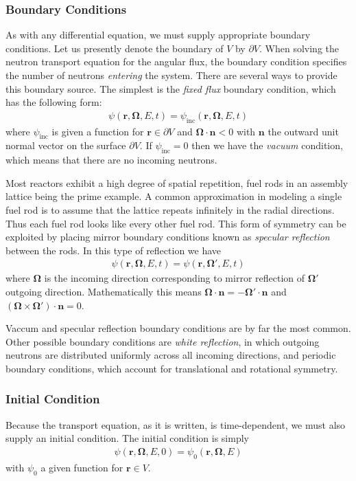 \documentclass[11pt]{article}
\renewcommand\vec{\mathbf}
\begin{document}
\subsubsection{Boundary Conditions}
\label{sec:orgheadline46}
As with any differential equation, we must supply appropriate boundary conditions.  Let us presently denote the boundary of \(V\) by \(\partial V\).  When solving the neutron transport equation for the angular flux, the boundary condition specifies the number of neutrons \emph{entering} the system.  There are several ways to provide this boundary source.  The simplest is the \emph{fixed flux} boundary condition, which has the following form:
\begin{align}
  \psi(\vec{r},\vec{\Omega},E,t) = \psi_\text{inc}(\vec{r},\vec{\Omega},E,t)
\end{align}
where \(\psi_\text{inc}\) is given a function for \(\vec{r} \in \partial V\) and \(\vec{\Omega} \cdot \vec{n} < 0\) with \(\vec{n}\) the outward unit normal vector on the surface \(\partial V\).  If \(\psi_\text{inc} = 0\) then we have the \emph{vacuum} condition, which means that there are no incoming neutrons.

Most reactors exhibit a high degree of spatial repetition, fuel rods in an assembly lattice being the prime example.  A common approximation in modeling a single fuel rod is to assume that the lattice repeats infinitely in the radial directions.  Thus each fuel rod looks like every other fuel rod.  This form of symmetry can be exploited by placing mirror boundary conditions known as \emph{specular reflection} between the rods.  In this type of reflection we have
\begin{align}
  \psi(\vec{r},\vec{\Omega},E,t) = \psi(\vec{r},\vec{\Omega}',E,t)
\end{align}
where \(\vec{\Omega}\) is the incoming direction corresponding to mirror reflection of \(\vec{\Omega}'\) outgoing direction.  Mathematically this means \(\vec{\Omega} \cdot \vec{n} = - \vec{\Omega}' \cdot \vec{n}\) and \(\left(\vec{\Omega} \times \vec{\Omega}'\right) \cdot \vec{n} = 0\).

Vaccum and specular reflection boundary conditions are by far the most common.  Other possible boundary conditions are \emph{white reflection}, in which outgoing neutrons are distributed uniformly across all incoming directions, and periodic boundary conditions, which account for translational and rotational symmetry.

\subsubsection{Initial Condition}
\label{sec:orgheadline47}
Because the transport equation, as it is written, is time-dependent, we must also supply an initial condition.  The initial condition is simply
\begin{align}
  \psi(\vec{r},\vec{\Omega},E,0) = \psi_0(\vec{r},\vec{\Omega},E)
\end{align}
with \(\psi_0\) a given function for \(\vec{r} \in V\).
\end{document}
